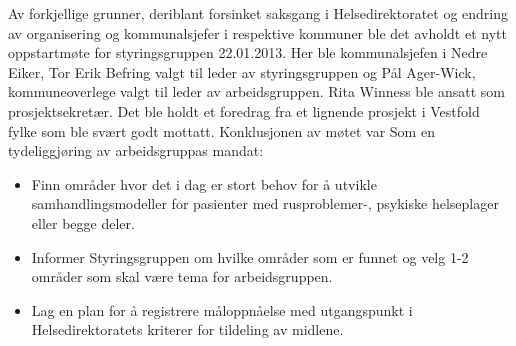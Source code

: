 \documentclass[11pt]{report} %
\begin{document}
                Av forkjellige grunner, deriblant forsinket saksgang i Helsedirektoratet og endring av organisering og kommunalsjefer i respektive kommuner ble det avholdt et nytt oppstartmøte for styringsgruppen 22.01.2013. Her ble kommunalsjefen i Nedre Eiker, Tor Erik Befring valgt til leder av styringsgruppen og Pål Ager-Wick, kommuneoverlege valgt til leder av arbeidsgruppen. Rita Winness ble ansatt som prosjektsekretær. Det ble holdt et foredrag fra et lignende prosjekt i Vestfold fylke \cite{sporVf}som ble svært godt mottatt. 
                Konklusjonen av møtet var \cite{strgr_mref13-1}Som en tydeliggjøring av arbeidsgruppas mandat:
                  \begin{itemize}
                  \item Finn områder hvor det i dag er stort behov for å utvikle samhandlingsmodeller for pasienter med rusproblemer-, psykiske helseplager eller begge deler.\\
                  \item Informer Styringsgruppen om hvilke områder som er funnet og velg 1-2 områder som skal være tema for arbeidsgruppen.\\
                  \item Lag en plan for å registrere måloppnåelse med utgangspunkt i Helsedirektoratets kriterer for tildeling av midlene.\\
                  \end{itemize}
\end{document}
